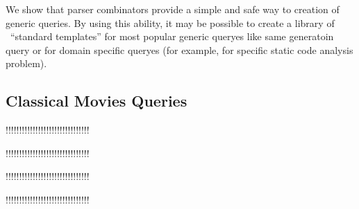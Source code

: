 We show that parser combinators provide a simple and safe way to creation of generic queries.
By using this ability, it may be possible to create a library of \ ``standard templates'' for most popular generic queryes like same generatoin query or for domain specific queryes (for example, for specific static code analysis problem).


\subsection{Classical Movies Queries}

!!!!!!!!!!!!!!!!!!!!!!!!!!!!!!!

!!!!!!!!!!!!!!!!!!!!!!!!!!!!!!!

!!!!!!!!!!!!!!!!!!!!!!!!!!!!!!!

!!!!!!!!!!!!!!!!!!!!!!!!!!!!!!!